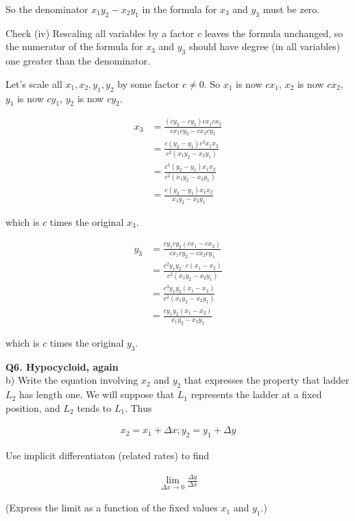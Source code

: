 \documentclass[9pt]{article}
\begin{document}
So the denominator $x_1 y_2 - x_2 y_1$ in the formula for $x_3$ and $y_3$ must be zero.

\begin{tcolorbox}
  Check (iv) Rescaling all variables by a factor $c$ leaves the formula unchanged, so the numerator of the formula for $x_3$ and $y_3$ should have degree (in all variables) one greater than the denominator.
\end{tcolorbox}

Let's scale all $x_1, x_2, y_1, y_2$ by some factor $c \neq 0$. So $x_1$ is now $c x_1$, $x_2$ is now $c x_2$, $y_1$ is now $c y_1$, $y_2$ is now $c y_2$.

\begin{align*}
  x_3 &= \frac{(c y_2 - c y_1) c x_1 c x_2}{c x_1 c y_2 - c x_2 c y_1} \\
      &= \frac{c (y_2 - y_1) c^2 x_1 x_2}{c^2(x_1 y_2 - x_2 y_1)} \\
      &= \frac{c^3 (y_2 - y_1) x_1 x_2}{c^2(x_1 y_2 - x_2 y_1)} \\
      &= \frac{c (y_2 - y_1) x_1 x_2}{x_1 y_2 - x_2 y_1}
\end{align*}

which is $c$ times the original $x_3$.

\begin{align*}
  y_3 &= \frac{c y_1 c y_2 (c x_1 - c x_2)}{c x_1 c y_2 - c x_2 c y_1} \\
      &= \frac{c^2 y_1 y_2 \cdot c (x_1 - x_2)}{c^2 (x_1 y_2 - x_2 y_1)} \\
      &= \frac{c^3 y_1 y_2 (x_1 - x_2)}{c^2 (x_1 y_2 - x_2 y_1)} \\
      &= \frac{c y_1 y_2 (x_1 - x_2)}{x_1 y_2 - x_2 y_1}
\end{align*}

which is $c$ times the original $y_3$.


\begin{tcolorbox}
  \textbf{Q6. Hypocycloid, again} \\
  b) Write the equation involving $x_2$ and $y_2$ that expresses the property that ladder $L_2$ has length one. We will suppose that $L_1$ represents the ladder at a fixed position, and $L_2$ tends to $L_1$. Thus

  \begin{align*}
    x_2 = x_1 + \Delta x; y_2 = y_1 + \Delta y
  \end{align*}

  Use implicit differentiaton (related rates) to find

  \begin{align*}
    \lim_{\Delta x \rightarrow 0}\frac{\Delta y}{\Delta x}
  \end{align*}

  (Express the limit as a function of the fixed values $x_1$ and $y_1$.)
\end{tcolorbox}
\end{document}
